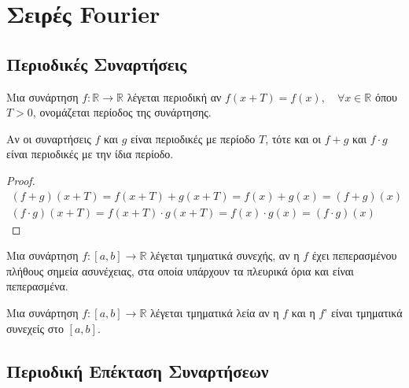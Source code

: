 



\pagestyle{vangelis}
\everymath{\displaystyle}




\chapter{Σειρές Fourier}


\section{Περιοδικές Συναρτήσεις}

\vspace{\baselineskip}

\begin{dfn}
  Μια συνάρτηση $ f \colon \mathbb{R} \to \mathbb{R} $ λέγεται 
  \textcolor{Col1}{περιοδική} αν 
  $
  f(x+T)=f(x),\quad \forall x \in \mathbb{R} 
  $ 
  όπου $ T>0 $, ονομάζεται \textcolor{Col1}{περίοδος} της συνάρτησης.
\end{dfn}

\begin{prop}
  Αν οι συναρτήσεις $ f $ και $g$ είναι περιοδικές με περίοδο $T$, τότε και οι 
  $ f+g $ και $ f\cdot g $ είναι περιοδικές με την ίδια περίοδο.
\end{prop}
\begin{proof}
  \begin{align*}
    (f+g)(x+T) = f(x+T)+g(x+T)=f(x)+g(x)=(f+g)(x) \\
    (f\cdot g)(x+T) = f(x+T)\cdot g(x+T)=f(x)\cdot g(x)=(f\cdot g)(x) 
  \end{align*} 
\end{proof}

\begin{dfn}
  Μια συνάρτηση $ f \colon [a,b] \to \mathbb{R} $ λέγεται 
  \textcolor{Col1}{τμηματικά συνεχής}, αν η  $f$ έχει πεπερασμένου πλήθους 
  σημεία ασυνέχειας, στα οποία υπάρχουν τα πλευρικά όρια και είναι πεπερασμένα.
\end{dfn}

\begin{dfn}
  Μια συνάρτηση  $ f \colon [a,b] \to \mathbb{R} $  λέγεται  
  \textcolor{Col1}{τμηματικά λεία} αν η $f$ και η $f$' είναι τμηματικά συνεχείς 
  στο $ [a,b] $.     
\end{dfn}


\section{Περιοδική Επέκταση Συναρτήσεων}

